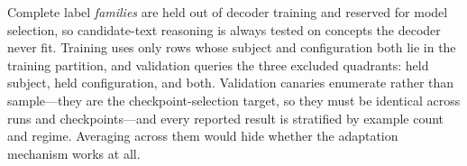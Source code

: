 Complete label \emph{families} are held out of decoder training and reserved for model selection,
so candidate-text reasoning is always tested on concepts the decoder never fit. Training uses only
rows whose subject and configuration both lie in the training partition, and validation queries the
three excluded quadrants: held subject, held configuration, and both. Validation canaries enumerate
rather than sample---they are the checkpoint-selection target, so they must be identical across
runs and checkpoints---and every reported result is stratified by example count and regime.
Averaging across them would hide whether the adaptation mechanism works at all.
